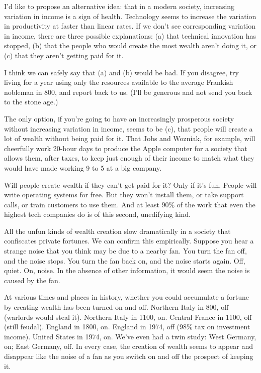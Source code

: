 I'd like to propose an alternative idea: that in a modern society,
increasing variation in income is a sign of health. Technology seems to
increase the variation in productivity at faster than linear rates. If
we don't see corresponding variation in income, there are three possible
explanations: (a) that technical innovation has stopped, (b) that the
people who would create the most wealth aren't doing it, or (c) that
they aren't getting paid for it.

I think we can safely say that (a) and (b) would be bad. If you
disagree, try living for a year using only the resources available to
the average Frankish nobleman in 800, and report back to us. (I'll be
generous and not send you back to the stone age.)

The only option, if you're going to have an increasingly prosperous
society without increasing variation in income, seems to be (c), that
people will create a lot of wealth without being paid for it. That Jobs
and Wozniak, for example, will cheerfully work 20-hour days to produce
the Apple computer for a society that allows them, after taxes, to keep
just enough of their income to match what they would have made working 9
to 5 at a big company.

Will people create wealth if they can't get paid for it? Only if it's
fun. People will write operating systems for free. But they won't
install them, or take support calls, or train customers to use them. And
at least 90\% of the work that even the highest tech companies do is of
this second, unedifying kind.

All the unfun kinds of wealth creation slow dramatically in a society
that confiscates private fortunes. We can confirm this empirically.
Suppose you hear a strange noise that you think may be due to a nearby
fan. You turn the fan off, and the noise stops. You turn the fan back
on, and the noise starts again. Off, quiet. On, noise. In the absence of
other information, it would seem the noise is caused by the fan.

At various times and places in history, whether you could accumulate a
fortune by creating wealth has been turned on and off. Northern Italy in
800, off (warlords would steal it). Northern Italy in 1100, on. Central
France in 1100, off (still feudal). England in 1800, on. England in
1974, off (98\% tax on investment income). United States in 1974, on.
We've even had a twin study: West Germany, on; East Germany, off. In
every case, the creation of wealth seems to appear and disappear like
the noise of a fan as you switch on and off the prospect of keeping it.

